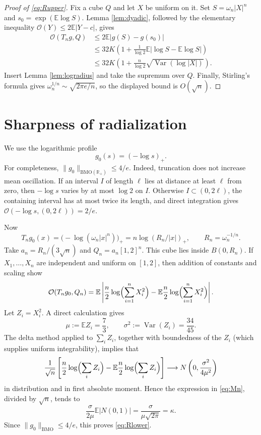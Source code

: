 \documentclass[11pt]{article}
\newcommand{\R}{\mathbb R}
\newcommand{\BMO}{\mathrm{BMO}}
\newcommand{\osc}{\mathcal O}
\newcommand{\E}{\mathbb E}
\newcommand{\1}{\mathbf 1}
\begin{document}
\begin{proof}[Proof of \eqref{eq:Rupper}]
Fix a cube $Q$ and let $X$ be uniform on it.  Set
$S=\omega_n|X|^n$ and $s_0=\exp(\E\log S)$.  Lemma
\ref{lem:dyadic}, followed by the elementary inequality
$\osc(Y)\le2\E|Y-c|$, gives
\begin{align*}
 \osc(T_ng,Q)
 &\le2\E|g(S)-g(s_0)|\\
 &\le32K\left(1+\frac1{\log2}\E|\log S-\E\log S|\right)\\
 &\le32K\left(1+\frac n{\log2}
        \sqrt{\operatorname{Var}(\log|X|)}\right).
\end{align*}
Insert Lemma \ref{lem:logradius} and take the supremum over $Q$.
Finally, Stirling's formula gives
$\omega_n^{1/n}\sim\sqrt{2\pi e/n}$, so the displayed bound is
$O(\sqrt n)$.
\end{proof}

\section{Sharpness of radialization}

We use the logarithmic profile
\[
 g_0(s)=(-\log s)_+.
\]
For completeness, $\|g_0\|_{\BMO(\R_+)}\le4/e$.  Indeed, truncation does
not increase mean oscillation.  If an interval $I$ of length $\ell$ lies at
distance at least $\ell$ from zero, then $-\log s$ varies by at most
$\log2$ on $I$.  Otherwise $I\subset(0,2\ell)$, the containing interval
has at most twice its length, and direct integration gives
$\osc(-\log s,(0,2\ell))=2/e$.

Now
\[
 T_ng_0(x)=\bigl(-\log(\omega_n|x|^n)\bigr)_+
          =n\log(R_n/|x|)_+,
 \qquad R_n=\omega_n^{-1/n}.
\]
Take $a_n=R_n/(3\sqrt n)$ and $Q_n=a_n[1,2]^n$.  This cube lies inside
$B(0,R_n)$.  If $X_1,\ldots,X_n$ are independent and uniform on $[1,2]$,
then addition of constants and scaling show
\begin{equation}\label{eq:Mn}
 \osc(T_ng_0,Q_n)
 =\E\left|\frac n2\log\Bigl(\sum_{i=1}^nX_i^2\Bigr)
 -\E\frac n2\log\Bigl(\sum_{i=1}^nX_i^2\Bigr)\right|.
\end{equation}
Let $Z_i=X_i^2$.  A direct calculation gives
\[
 \mu:=\E Z_i=\frac73,\qquad
 \sigma^2:=\operatorname{Var}(Z_i)=\frac{34}{45}.
\]
The delta method applied to $\sum_iZ_i$, together with boundedness of the
$Z_i$ (which supplies uniform integrability), implies that
\[
 \frac1{\sqrt n}\left[
 \frac n2\log\Bigl(\sum_i Z_i\Bigr)
 -\E\frac n2\log\Bigl(\sum_i Z_i\Bigr)\right]
 \longrightarrow N\left(0,\frac{\sigma^2}{4\mu^2}\right)
\]
in distribution and in first absolute moment.  Hence the expression in
\eqref{eq:Mn}, divided by $\sqrt n$, tends to
\[
 \frac{\sigma}{2\mu}\E|N(0,1)|
 =\frac{\sigma}{\mu\sqrt{2\pi}}
 =\kappa.
\]
Since $\|g_0\|_{\BMO}\le4/e$, this proves \eqref{eq:Rlower}.
\end{document}
